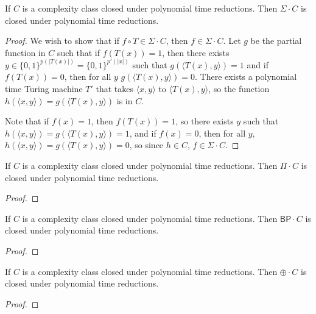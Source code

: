 \documentclass[11pt]{article}
\newcommand{\bp}{\textsf{BP}}
\newcommand{\parity}{\oplus}
\begin{document}
\begin{lemma}
If $C$ is a complexity class closed under polynomial time reductions. Then $\Sigma \cdot C$ is closed under polynomial time reductions.
\end{lemma}
\begin{proof}
We wish to show that if $f\circ T \in \Sigma \cdot C$, then $f \in \Sigma \cdot C$. Let $g$ be the partial function in $C$ such that if $f(T(x)) = 1$, then there exists $y\in\{0,1\}^{p(|T(x)|)} = \{0,1\}^{p'(|x|)}$ such that $g(\langle T(x),y\rangle) = 1$ and if $f(T(x)) = 0$, then for all $y$ $g(\langle T(x),y\rangle) = 0$. There exists a polynomial time Turing machine $T'$ that takes $\langle x, y\rangle$ to $\langle T(x), y\rangle$, so the function $h(\langle x, y\rangle) = g(\langle T(x), y\rangle)$ is in $C$.

Note that if $f(x) = 1$, then $f(T(x)) = 1$, so there exists $y$ such that $h(\langle x, y\rangle) = g(\langle T(x),y\rangle) = 1$, and if $f(x) = 0$, then for all $y$, $h(\langle x, y\rangle) = g(\langle T(x),y\rangle) = 0$, so since $h \in C$, $f \in \Sigma \cdot C$.
\end{proof}

\begin{lemma}
If $C$ is a complexity class closed under polynomial time reductions. Then $\Pi \cdot C$ is closed under polynomial time reductions.
\end{lemma}
\begin{proof}

\end{proof}

\begin{lemma}
If $C$ is a complexity class closed under polynomial time reductions. Then $\bp \cdot C$ is closed under polynomial time reductions.
\end{lemma}
\begin{proof}

\end{proof}

\begin{lemma}
If $C$ is a complexity class closed under polynomial time reductions. Then $\parity \cdot C$ is closed under polynomial time reductions.
\end{lemma}
\begin{proof}

\end{proof}

\end{document}
